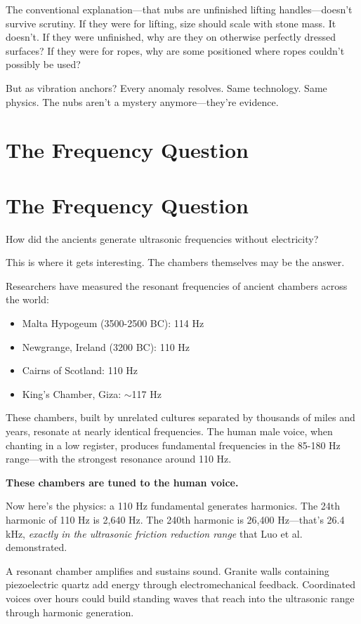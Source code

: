 \documentclass[11pt]{article}
\begin{document}
The conventional explanation—that nubs are unfinished lifting handles—doesn't survive scrutiny. If they were for lifting, size should scale with stone mass. It doesn't. If they were unfinished, why are they on otherwise perfectly dressed surfaces? If they were for ropes, why are some positioned where ropes couldn't possibly be used?

But as vibration anchors? Every anomaly resolves. Same technology. Same physics. The nubs aren't a mystery anymore—they're evidence.

\section*{The Frequency Question}

\section*{The Frequency Question}

How did the ancients generate ultrasonic frequencies without electricity?

This is where it gets interesting. The chambers themselves may be the answer.

Researchers have measured the resonant frequencies of ancient chambers across the world:
\begin{itemize}
    \item Malta Hypogeum (3500-2500 BC): 114 Hz
    \item Newgrange, Ireland (3200 BC): 110 Hz
    \item Cairns of Scotland: 110 Hz
    \item King's Chamber, Giza: $\sim$117 Hz
\end{itemize}

These chambers, built by unrelated cultures separated by thousands of miles and years, resonate at nearly identical frequencies. The human male voice, when chanting in a low register, produces fundamental frequencies in the 85-180 Hz range—with the strongest resonance around 110 Hz.

\textbf{These chambers are tuned to the human voice.}

Now here's the physics: a 110 Hz fundamental generates harmonics. The 24th harmonic of 110 Hz is 2,640 Hz. The 240th harmonic is 26,400 Hz—that's 26.4 kHz, \textit{exactly in the ultrasonic friction reduction range} that Luo et al. demonstrated.

A resonant chamber amplifies and sustains sound. Granite walls containing piezoelectric quartz add energy through electromechanical feedback. Coordinated voices over hours could build standing waves that reach into the ultrasonic range through harmonic generation.
\end{document}
